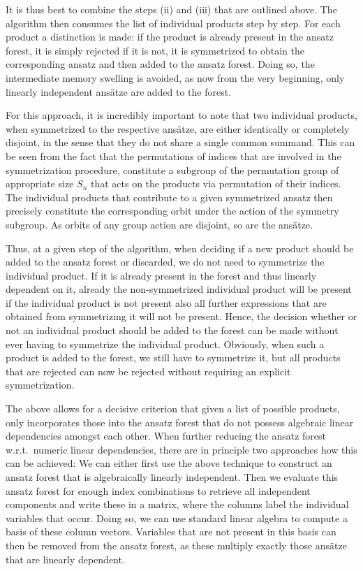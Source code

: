 It is thus best to combine the steps (ii) and (iii) that are outlined above. The algorithm then consumes the list of individual products step by step. For each product a distinction is made: if the product is already present in the ansatz forest, it is simply rejected if it is not, it is symmetrized to obtain the corresponding ansatz and then added to the ansatz forest. Doing so, the intermediate memory swelling is avoided, as now from the very beginning, only linearly independent ansätze are added to the forest.

For this approach, it is incredibly important to note that two individual products, when symmetrized to the respective ansätze, are either identically or completely disjoint, in the sense that they do not share a single common summand. This can be seen from the fact that the permutations of indices that are involved in the symmetrization procedure, constitute a subgroup of the permutation group of appropriate size $S_n$ that acts on the products via permutation of their indices. The individual products that contribute to a given symmetrized ansatz then precisely constitute the corresponding orbit under the action of the symmetry subgroup. As orbits of any group action are disjoint, so are the ansätze. 

Thus, at a given step of the algorithm, when deciding if a new product should be added to the ansatz forest or discarded, we do not need to symmetrize the individual product. If it is already present in the forest and thus linearly dependent on it, already the non-symmetrized individual product will be present if the individual product is not present also all further expressions that are obtained from symmetrizing it will not be present. Hence, the decision whether or not an individual product should be added to the forest can be made without ever having to symmetrize the individual product. Obviously, when such a product is added to the forest, we still have to symmetrize it, but all products that are rejected can now be rejected without requiring an explicit symmetrization.

The above allows for a decisive criterion that given a list of possible products, only incorporates those into the ansatz forest that do not possess algebraic linear dependencies amongst each other. When further reducing the ansatz forest w.r.t.\ numeric linear dependencies, there are in principle two approaches how this can be achieved: We can either first use the above technique to construct an ansatz forest that is algebraically linearly independent. Then we evaluate this ansatz forest for enough index combinations to retrieve all independent components and write these in a matrix, where the columns label the individual variables that occur. Doing so, we can use standard linear algebra to compute a basis of these column vectors. Variables that are not present in this basis can then be removed from the ansatz forest, as these multiply exactly those ansätze that are linearly dependent. 

